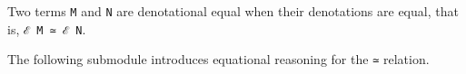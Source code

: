Two terms \texttt{M} and \texttt{N} are denotational equal when their
denotations are equal, that is, \texttt{ℰ\ M\ ≃\ ℰ\ N}.

The following submodule introduces equational reasoning for the
\texttt{≃} relation.

\begin{fence}
\begin{code}%
\>[0]\<%
\\
\>[0]\AgdaSpace{}%
\AgdaSpace{}%
\AgdaSymbol{\{}\AgdaSpace{}%
\AgdaSymbol{:}\AgdaSpace{}%
\AgdaSymbol{\}}\AgdaSpace{}%
\<%
\\
%
\\[\AgdaEmptyExtraSkip]%
\>[0][@{}l@{\AgdaIndent{0}}]%
\>[2]%
\>[9]\AgdaSpace{}%
\<%
\\
%
\>[2]\AgdaSpace{}%
\AgdaSpace{}%
\AgdaSpace{}%
\<%
\\
%
\>[2]%
\>[9]\AgdaSpace{}%
\<%
\\
%
\\[\AgdaEmptyExtraSkip]%
%
\>[2]\AgdaSpace{}%
\AgdaSymbol{:}\AgdaSpace{}%
\AgdaSpace{}%
\AgdaSymbol{\{}\AgdaSpace{}%
\AgdaSpace{}%
\AgdaSymbol{:}\AgdaSpace{}%
\AgdaSpace{}%
\AgdaSymbol{\}}\<%
\\
\>[2][@{}l@{\AgdaIndent{0}}]%
\>[4]%
\>[1247I]\AgdaSpace{}%
\AgdaSpace{}%
\<%
\\
\>[.][@{}l@{}]\<[1247I]%
\>[6]\AgdaComment{-----}\<%
\\
%
\>[4]\AgdaSpace{}%
\AgdaSpace{}%
\AgdaSpace{}%
\<%
\\
%
\>[2]\AgdaSpace{}%
%
\>[13]\AgdaSymbol{=}%
\>[16]\<%
\\
%
\\[\AgdaEmptyExtraSkip]%
%
\>[2]\AgdaSpace{}%

\end{code}
\end{fence}
